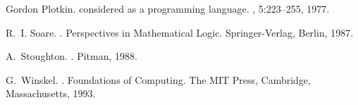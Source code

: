 \documentclass[11pt]{article}
\begin{document}
\begin{thebibliography}{Cur92b}
Gordon Plotkin.
 considered as a programming language.
, 5:223--255, 1977.

R.~I. Soare.
.
\newblock Perspectives in Mathematical Logic. Springer-Verlag, Berlin, 1987.

A.~Stoughton.
.
\newblock Pitman, 1988.

G.~Winskel.
.
\newblock Foundations of Computing. The MIT Press, Cambridge, Massachusetts,
  1993.
\end{thebibliography}
\end{document}
